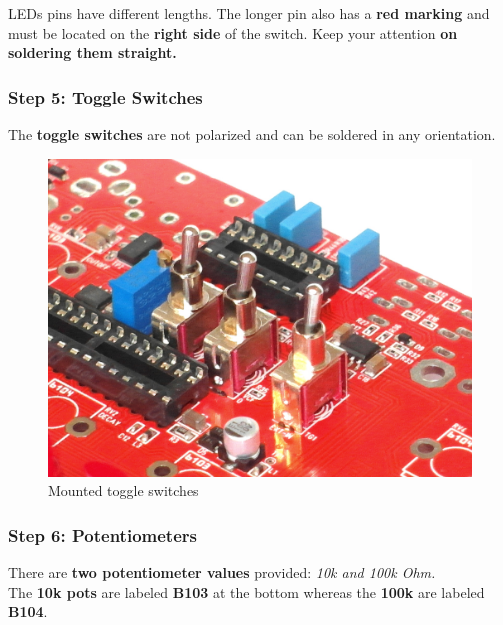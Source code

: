 \documentclass{scrartcl}
\begin{document}
LEDs pins have different lengths. The longer pin also has a \textbf{red marking} and must be located on the \textbf{right side} of the switch.
Keep your attention \textbf{on soldering them straight.}

\subsubsection{Step 5: Toggle Switches}

The \textbf{toggle switches} are not polarized and can be soldered in any orientation.

\begin{figure}[!ht]
    \begin{center}
        \includegraphics[scale=0.25]{assets/pcb-toggles.jpg}
        \caption{Mounted toggle switches}
    \end{center}
\end{figure}

\subsubsection{Step 6: Potentiometers}

There are \textbf{two potentiometer values} provided: \emph{10k and 100k Ohm.} \\
The \textbf{10k pots} are labeled \textbf{B103} at the bottom whereas the \textbf{100k} are labeled \textbf{B104}.
\end{document}
